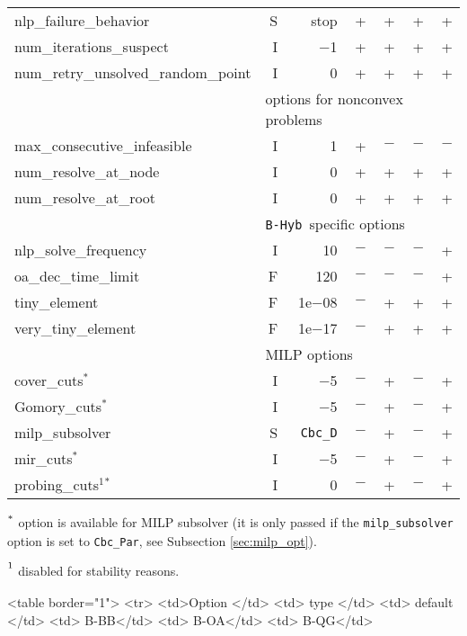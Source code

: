 {\begin{latexonly}
\begin{threeparttable}
\begin{tabular}{|l|r|r|r|r|r|r|}
nlp\_failure\_behavior & S & stop   & + & + & + & + \\
num\_iterations\_suspect & I & $-$1 & + & + & + & + \\
num\_retry\_unsolved\_random\_point & I & 0 & + & + & + & + \\
\hline
\multicolumn{1}{|c}{} & \multicolumn{6}{l|}{options for nonconvex problems}\\
\hline
max\_consecutive\_infeasible & I & 1 & + & $-$ & $-$ & $-$\\
num\_resolve\_at\_node & I & 0 & + & +  & + & + \\
num\_resolve\_at\_root & I & 0& + & + & + & +  \\
\hline
\multicolumn{1}{|c}{} & \multicolumn{6}{l|}{{\tt B-Hyb }specific options}\\
\hline
nlp\_solve\_frequency & I & 10 & $-$ & $-$ & $-$ & +\\
oa\_dec\_time\_limit & F& 120 & $-$ & $-$ & $-$ & +\\
tiny\_element & F & 1e$-$08 & $-$ & + & + & + \\
very\_tiny\_element & F & 1e$-$17 & $-$ & + & + & + \\
\hline
\multicolumn{1}{|c}{} & \multicolumn{6}{l|}{MILP options}\\
\hline
cover\_cuts$^*$  & I & $-$5 & $-$ & + & $-$ & +\\
Gomory\_cuts$^*$ & I & $-$5 & $-$ &  + & $-$ & + \\
milp\_subsolver &S & {\tt Cbc\_D} & $-$ & + & $-$ & + \\
mir\_cuts$^*$  & I & $-$5 & $-$  & + & $-$ &+\\
probing\_cuts$^1$$^*$  & I & 0 & $-$ & + & $-$ & +\\
\hline
\end{tabular}
\begin{tablenotes}
\item $\strut^*$ option is available
         for MILP subsolver (it is only passed if the {\tt milp\_subsolver} option is set to {\tt Cbc\_Par},
         see Subsection \ref{sec:milp_opt}).
\item $\strut^1$ disabled for stability reasons.
\end{tablenotes}
\end{threeparttable}
\end{latexonly}
}{
\begin{rawhtml}
<table border="1">
  <tr>
    <td>Option </td>
    <td> type </td>
    <td> default </td>
    <td> B-BB</td>
    <td> B-OA</td>
    <td> B-QG</td>

\end{rawhtml}}
